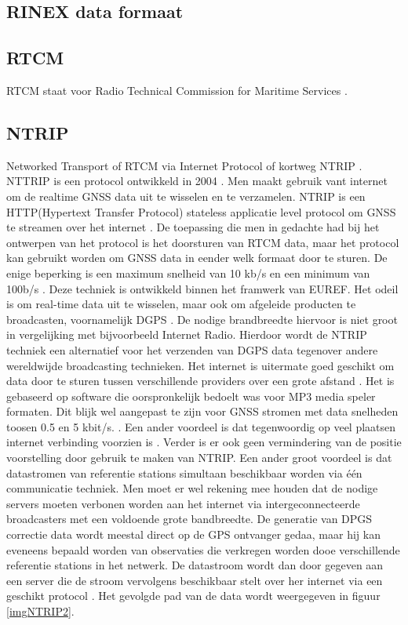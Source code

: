 \subsection{RINEX data formaat}

\subsection{RTCM}
RTCM staat voor Radio Technical Commission for Maritime Services \cite{LBibGLONASS}.

\subsection{NTRIP}
\label{LNTR}
Networked Transport of RTCM via Internet Protocol of kortweg NTRIP \cite{LBibNTRIP,LBibNTRIP3}. NTTRIP is een protocol ontwikkeld in 2004 \cite{LBibNTRIP3}. Men maakt gebruik vant internet om de realtime GNSS data uit te wisselen en te verzamelen. NTRIP is een HTTP(Hypertext Transfer Protocol) stateless applicatie level protocol om GNSS te streamen over het internet \cite{LBibNTRIP}. De toepassing die men in gedachte had bij het ontwerpen van het protocol is het doorsturen van RTCM data, maar het protocol kan gebruikt worden om GNSS data in eender welk formaat door te sturen. De enige beperking is een maximum snelheid van 10 kb/s en een minimum van 100b/s \cite{LBibNTRIP3}. Deze techniek is ontwikkeld binnen het framwerk van EUREF. Het odeil is om real-time data uit te wisselen, maar ook om afgeleide producten te broadcasten, voornamelijk DGPS \cite{LBibNTRIP2}. De nodige brandbreedte hiervoor is niet groot in vergelijking met bijvoorbeeld Internet Radio\cite{LBibNTRIP}. Hierdoor wordt de NTRIP techniek een alternatief voor het verzenden van DGPS data tegenover andere  wereldwijde broadcasting technieken. Het internet is uitermate goed geschikt om data door te sturen tussen verschillende providers over een grote afstand \cite{LBibNTRIP2}. Het is gebaseerd op software die oorspronkelijk bedoelt was voor MP3 media speler formaten. Dit blijk wel aangepast te zijn voor GNSS stromen met data snelheden toosen 0.5 en 5 kbit/s. \cite{LBibGPS}. Een ander voordeel is dat tegenwoordig op veel plaatsen internet verbinding voorzien is \cite{LBibNTRIP}. Verder is er ook geen vermindering van de positie voorstelling door gebruik te maken van NTRIP. Een ander groot voordeel is dat datastromen van referentie stations simultaan beschikbaar worden via \'e\'en communicatie techniek. Men moet er wel rekening mee houden dat de nodige servers moeten verbonen worden aan het internet via intergeconnecteerde broadcasters met een voldoende grote bandbreedte.  De generatie van DPGS correctie data wordt meestal direct op de GPS ontvanger gedaa, maar hij kan eveneens bepaald worden van observaties die verkregen worden dooe verschillende referentie stations in het netwerk. De datastroom wordt dan door gegeven aan een server die de stroom vervolgens beschikbaar stelt over her internet via een geschikt protocol \cite{LBibNTRIP2}. Het gevolgde pad van de data wordt weergegeven in figuur \ref{imgNTRIP2}.

